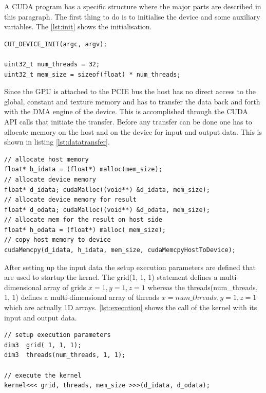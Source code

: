 A \gls{CUDA} program has a specific structure where the major parts are
described in this paragraph. The first thing to do is to initialise the device
and some auxiliary variables. The \autoref{lst:init} shows the
initialisation.

%
\begin{lstlisting}[caption=Hardware initialisation, label=lst:init]
CUT_DEVICE_INIT(argc, argv);

uint32_t num_threads = 32;
uint32_t mem_size = sizeof(float) * num_threads;				
\end{lstlisting} 
%

Since the \gls{GPU} is attached to the \gls{PCIE} bus the host has no direct
access to the global, constant and texture memory and has to transfer the data
back and forth with the \gls{DMA} engine of the device. This is accomplished
through the \gls{CUDA} \gls{API} calls that initiate the transfer. Before any
transfer can be done one has to allocate memory on the host and on the device
for input and output data. This is shown in listing \autoref{lst:datatransfer}.


\begin{lstlisting}[caption=Data transfer of data, label=lst:datatransfer]
// allocate host memory 
float* h_idata = (float*) malloc(mem_size);
// allocate device memory 
float* d_idata; cudaMalloc((void**) &d_idata, mem_size);
// allocate device memory for result
float* d_odata; cudaMalloc((void**) &d_odata, mem_size);
// allocate mem for the result on host side
float* h_odata = (float*) malloc( mem_size);
// copy host memory to device 
cudaMemcpy(d_idata, h_idata, mem_size, cudaMemcpyHostToDevice);
\end{lstlisting} 


After setting up the input data the setup execution parameters are defined that
are used to startup the kernel. The \textsf{grid(1, 1, 1)} statement defines
a multi-dimensional array of grids $x=1, y=1, z=1$ whereas the
\textsf{threads(num\_threads, 1, 1)} defines a multi-dimensional array of
threads $x=num\_threads, y=1, z=1$ which are actually \gls{1D} arrays.
\autoref{lst:execution} shows the call of the kernel with its input and
output data.


\begin{lstlisting}[caption=Execution of the Kernel, label=lst:execution]
// setup execution parameters
dim3  grid( 1, 1, 1);
dim3  threads(num_threads, 1, 1);

// execute the kernel
kernel<<< grid, threads, mem_size >>>(d_idata, d_odata);
\end{lstlisting} 

